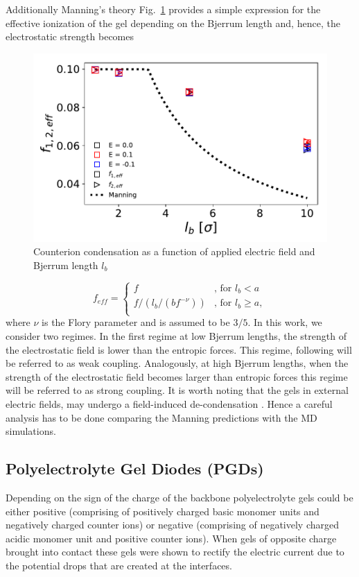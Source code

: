 \documentclass[twoside,twocolumn,9pt]{article}
\begin{document}
Additionally Manning's theory Fig.~\ref{fig:condensation} provides a simple expression for the effective ionization of the gel depending on the Bjerrum length and, hence, the electrostatic strength \cite{Mann2005} becomes 

\begin{figure}[h]
\centering
  \includegraphics[width=.45\textwidth]{fig/Condensation_k200_rcut25.pdf}
  \caption{Counterion condensation as a function of applied electric field and Bjerrum length $l_b$}
  \label{fig:condensation}
\end{figure}

\begin{equation}\label{eq:mann_explain}
  f_{eff} =
  \begin{cases}
    f & \text{, for $l_b<a$} \\
    f/(l_b/(b f^{-\nu})) & \text{, for $l_b \geq a$}, \\
  \end{cases}
\end{equation}
where $\nu$ is the Flory parameter and is assumed to be $3/5$. In this work, we consider two regimes.  In the first regime at low Bjerrum lengths, the strength of the electrostatic field is lower than the entropic forces. This regime, following \citep{Erbas2015} will be referred to as weak coupling. Analogously, at high Bjerrum lengths, when the strength of the electrostatic field becomes larger than entropic forces this regime will be referred to as strong coupling. It is worth noting that the gels in external electric fields, may undergo a field-induced de-condensation \citep{Erbas2015}. Hence a careful analysis  has to be done comparing the Manning predictions with the MD simulations.


\subsection{Polyelectrolyte Gel Diodes (PGDs)}

Depending on the sign of the charge of the backbone polyelectrolyte gels could be either positive (comprising of positively charged basic monomer units and negatively charged counter ions) or negative (comprising of negatively charged acidic monomer unit and positive counter ions). When gels of opposite charge brought into contact these gels were shown to rectify the electric current due to the potential drops that are created at the interfaces.
\end{document}
